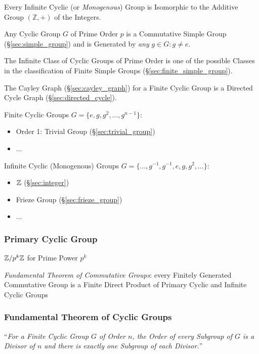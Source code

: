 Every Infinite Cyclic (or \emph{Monogenous}) Group is Isomorphic to the Additive
Group $(\mathbb{Z}, +)$ of the Integers.

Any Cyclic Group $G$ of Prime Order $p$ is a Commutative Simple Group
(\S\ref{sec:simple_group}) and is Generated by \emph{any} $g \in G : g \neq e$.

The Infinite Class of Cyclic Groups of Prime Order is one of the possible
Classes in the classification of Finite Simple Groups
(\S\ref{sec:finite_simple_group}).

The Cayley Graph (\S\ref{sec:cayley_graph}) for a Finite Cyclic Group is a
Directed Cycle Graph (\S\ref{sec:directed_cycle}).

Finite Cyclic Groups $G = \{ e, g, g^2, \ldots, g^{n-1} \}$:
\begin{itemize}
  \item Order 1: Trivial Group (\S\ref{sec:trivial_group})
  \item ...
\end{itemize}

Infinite Cyclic (Monogenous) Groups
$G = \{ \ldots, g^{-1}, g^{-1}, e, g, g^2, \ldots \}$:
\begin{itemize}
  \item $\mathbb{Z}$ (\S\ref{sec:integer})
  \item Frieze Group (\S\ref{sec:frieze_group})
  \item ...
\end{itemize}



\subsubsection{Primary Cyclic Group}\label{sec:primary_cyclic_group}

$\mathbb{Z}/p^k \mathbb{Z}$ for Prime Power $p^k$

\emph{Fundamental Theorem of Commutative Groups}: every Finitely Generated
Commutative Group is a Finite Direct Product of Primary Cyclic and Infinite
Cyclic Groups



\subsubsection{Fundamental Theorem of Cyclic Groups}
\label{sec:fundamental_cyclic_groups_theorem}

``\emph{For a Finite Cyclic Group $G$ of Order $n$, the Order of every
Subgroup of $G$ is a Divisor of $n$ and there is exactly one Subgroup of
each Divisor.}''



